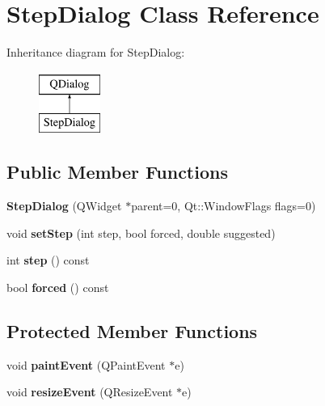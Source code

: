 \hypertarget{class_step_dialog}{\section{Step\-Dialog Class Reference}
\label{class_step_dialog}
}
Inheritance diagram for Step\-Dialog\-:\begin{figure}[H]
\begin{center}
\leavevmode
\includegraphics[height=2.000000cm]{class_step_dialog}
\end{center}
\end{figure}
\subsection*{Public Member Functions}
\begin{DoxyCompactItemize}
\item 
\hypertarget{class_step_dialog_a9edeecddf404ad3a4a4517180bc95559}{{\bfseries Step\-Dialog} (Q\-Widget $\ast$parent=0, Qt\-::\-Window\-Flags flags=0)}\label{class_step_dialog_a9edeecddf404ad3a4a4517180bc95559}

\item 
\hypertarget{class_step_dialog_aa557bf801ae09e528cafe40a2b616818}{void {\bfseries set\-Step} (int step, bool forced, double suggested)}\label{class_step_dialog_aa557bf801ae09e528cafe40a2b616818}

\item 
\hypertarget{class_step_dialog_a6a6c27b8bcaa6e712bc9823cf65ab651}{int {\bfseries step} () const }\label{class_step_dialog_a6a6c27b8bcaa6e712bc9823cf65ab651}

\item 
\hypertarget{class_step_dialog_a1753bdb44a7f20152bfe8188e73f0048}{bool {\bfseries forced} () const }\label{class_step_dialog_a1753bdb44a7f20152bfe8188e73f0048}

\end{DoxyCompactItemize}
\subsection*{Protected Member Functions}
\begin{DoxyCompactItemize}
\item 
\hypertarget{class_step_dialog_ab33a466dd391a031590fd1c15d2b7434}{void {\bfseries paint\-Event} (Q\-Paint\-Event $\ast$e)}\label{class_step_dialog_ab33a466dd391a031590fd1c15d2b7434}

\item 
\hypertarget{class_step_dialog_af02d22fe1e014cebab92283f1ddabb55}{void {\bfseries resize\-Event} (Q\-Resize\-Event $\ast$e)}\label{class_step_dialog_af02d22fe1e014cebab92283f1ddabb55}

\end{DoxyCompactItemize}


